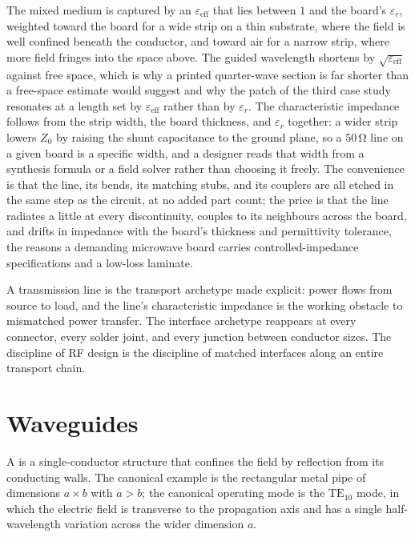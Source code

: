 The mixed medium is captured by an 
$\varepsilon_{\text{eff}}$ that lies between $1$ and the board's
$\varepsilon_r$, weighted toward the board for a wide strip on a thin
substrate, where the field is well confined beneath the conductor, and
toward air for a narrow strip, where more field fringes into the space
above. The guided wavelength shortens by $\sqrt{\varepsilon_{\text{eff}}}$
against free space, which is why a printed quarter-wave section is far
shorter than a free-space estimate would suggest and why the patch of the
third case study resonates at a length set by
$\varepsilon_{\text{eff}}$ rather than by $\varepsilon_r$. The
characteristic impedance follows from the strip width, the board
thickness, and $\varepsilon_r$ together: a wider strip lowers $Z_0$ by
raising the shunt capacitance to the ground plane, so a $50\,\si{\ohm}$
line on a given board is a specific width, and a designer reads that width
from a synthesis formula or a field solver rather than choosing it freely.
The convenience is that the line, its bends, its matching stubs, and its
couplers are all etched in the same step as the circuit, at no added part
count; the price is that the line radiates a little at every
discontinuity, couples to its neighbours across the board, and drifts in
impedance with the board's thickness and permittivity tolerance, the
reasons a demanding microwave board carries controlled-impedance
specifications and a low-loss laminate.

\begin{archetype}
A transmission line is the transport archetype made explicit: power
flows from source to load, and the line's characteristic impedance is
the working obstacle to mismatched power transfer. The interface
archetype reappears at every connector, every solder joint, and every
junction between conductor sizes. The discipline of RF design is the
discipline of matched interfaces along an entire transport chain.
\end{archetype}

\section{Waveguides}

A  is a single-conductor structure that confines
the field by reflection from its conducting walls. The canonical
example is the rectangular metal pipe of dimensions $a\times b$ with
$a>b$; the canonical operating mode is the $\text{TE}_{10}$ mode, in
which the electric field is transverse to the propagation axis and
has a single half-wavelength variation across the wider dimension $a$.

